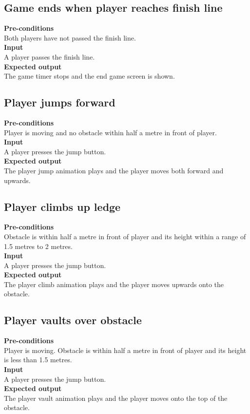 \documentclass[a4paper,10pt]{article}
\begin{document}
    \subsection{Game ends when player reaches finish line}
        \textbf{Pre-conditions}\\
        Both players have not passed the finish line. 
        \smallskip\\\textbf{Input}\\
        A player passes the finish line.
        \smallskip\\\textbf{Expected output}\\
        The game timer stops and the end game screen is shown.
        
    \subsection{Player jumps forward}
        \textbf{Pre-conditions}\\
        Player is moving and no obstacle within half a metre in front of player. 
        \smallskip\\\textbf{Input}\\
        A player presses the jump button.
        \smallskip\\\textbf{Expected output}\\
        The player jump animation plays and the player moves both forward and upwards. 
        
    \subsection{Player climbs up ledge}
    \textbf{Pre-conditions}\\
    Obstacle is within half a metre in front of player and its height within a range of 1.5 metres to 2 metres. 
    \smallskip\\\textbf{Input}\\
    A player presses the jump button.
    \smallskip\\\textbf{Expected output}\\
    The player climb animation plays and the player moves upwards onto the obstacle.
    
    \subsection{Player vaults over obstacle}
    \textbf{Pre-conditions}\\
    Player is moving. Obstacle is within half a metre in front of player and its height is less than 1.5 metres. 
    \smallskip\\\textbf{Input}\\
    A player presses the jump button.
    \smallskip\\\textbf{Expected output}\\
    The player vault animation plays and the player moves onto the top of the obstacle.
    
\end{document}
